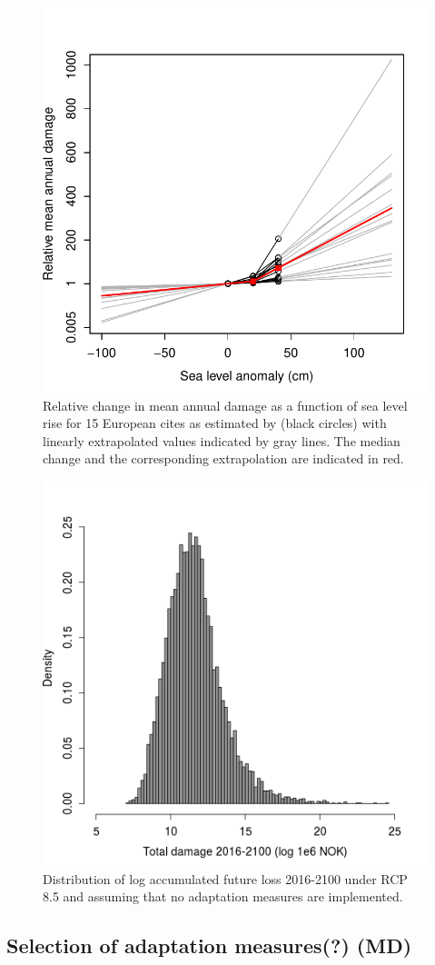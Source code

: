 \documentclass[draft,linenumbers]{agujournal}
\begin{document}
\begin{figure}[!hbpt]
\begin{center}
\includegraphics[width=0.5\linewidth]{EuropeanIncreaseLossExtrapolationUncertainty.pdf}
\caption{ Relative change in mean annual damage as a function of sea level rise for 15 European cites as estimated by \cite{Hallegatte&2013} (black circles) with linearly extrapolated values indicated by gray lines. The median change and the corresponding extrapolation are indicated in red.}
\label{fig:ChangeInDamage}
\end{center}
\end{figure}


\begin{figure}[!hbpt]
\begin{center}
\includegraphics[width=0.5\linewidth]{AccumulatedFutureLoss.png}
\caption{Distribution of log  accumulated future loss 2016-2100 under RCP 8.5 and assuming that no adaptation measures are implemented.} 
\label{fig:NoAction}
\end{center}
\end{figure}


\subsection{Selection of adaptation measures(?) {\color{blue} (MD)}}
\end{document}
